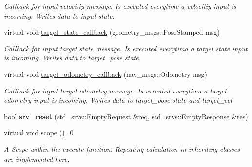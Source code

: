 \begin{DoxyCompactItemize}
\begin{DoxyCompactList}\small\item\em Callback for input velocitiy message. Is executed everytime a velocitiy input is incoming. Writes data to input state. \end{DoxyCompactList}\item 
virtual void \hyperlink{classController_a60f59dd761ce2d41dc9254f87164ded1}{target\+\_\+state\+\_\+callback} (geometry\+\_\+msgs\+::\+Pose\+Stamped msg)\hypertarget{classController_a60f59dd761ce2d41dc9254f87164ded1}{}\label{classController_a60f59dd761ce2d41dc9254f87164ded1}

\begin{DoxyCompactList}\small\item\em Callback for input target state message. Is executed everytima a target state input is incoming. Writes data to target\+\_\+pose state. \end{DoxyCompactList}\item 
virtual void \hyperlink{classController_ad9ccaff0c6f9989bd6c33a3d2179124d}{target\+\_\+odometry\+\_\+callback} (nav\+\_\+msgs\+::\+Odometry msg)\hypertarget{classController_ad9ccaff0c6f9989bd6c33a3d2179124d}{}\label{classController_ad9ccaff0c6f9989bd6c33a3d2179124d}

\begin{DoxyCompactList}\small\item\em Callback for input target odometry message. Is executed everytima a target odometry input is incoming. Writes data to target\+\_\+pose state and target\+\_\+vel. \end{DoxyCompactList}\item 
bool {\bfseries srv\+\_\+reset} (std\+\_\+srvs\+::\+Empty\+Request \&req, std\+\_\+srvs\+::\+Empty\+Response \&res)\hypertarget{classController_ae24861b9ecd088dc3a58db860fc417b1}{}\label{classController_ae24861b9ecd088dc3a58db860fc417b1}

\item 
virtual void \hyperlink{classController_af89e3d7ed87318418f0168727bd98f0f}{scope} ()=0\hypertarget{classController_af89e3d7ed87318418f0168727bd98f0f}{}\label{classController_af89e3d7ed87318418f0168727bd98f0f}

\begin{DoxyCompactList}\small\item\em A Scope within the execute function. Repeating calculation in inheriting classes are implemented here. \end{DoxyCompactList}\end{DoxyCompactItemize}
